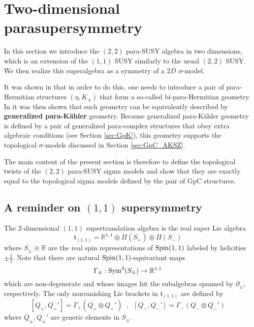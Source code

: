 \documentclass[letterpaper,12pt]{article}
\newcommand{\RR}{\mathbb{R}}
\theoremstyle{definition}
\theoremstyle{remark}
\theoremstyle{examples}
\begin{document}
\section{Two-dimensional parasupersymmetry}  \label{sec: parasusy}

In this section we introduce the $(2,2)$ para-SUSY algebra in two dimensions, which is an extension of the $(1,1)$ SUSY similarly to the usual $(2,2)$ SUSY. We then realize this superalgebra as a symmetry of a $2D$ $\sigma$-model.

It was shown in \cite{HullTwistedSUSY} that in order to do this, one needs to introduce a pair of para-Hermitian structures $(\eta,K_\pm)$ that form a so-called bi-para-Hermitian geometry. In \cite{Hu:2019zro} it was then shown that such geometry can be equivalently described by {\bf generalized para-K\"ahler} geometry. Because generalized para-K\"ahler geometry is defined by a pair of generalized para-complex structures that obey extra algebraic conditions (see Section \ref{sec:GpK}), this geometry supports the topological $\sigma$-models discussed in Section \ref{sec:GpC_AKSZ}.

The main content of the present section is therefore to define the topological twists of the $(2,2)$ para-SUSY sigma models and show that they are exactly equal to the topological sigma models defined by the pair of GpC structures.
%
%

\subsection{A reminder on $(1,1)$ supersymmetry}

The $2$-dimensional $(1,1)$ supertranslation algebra is the real super Lie algebra
\[
\mathfrak{t}_{(1,1)} = \RR^{1,1} \oplus \Pi (S_+) \oplus \Pi(S_-)
\]
where $S_\pm \cong \RR$ are the real spin representations of ${\rm Spin}(1,1)$ labeled by helicities $\pm \frac{1}{2}$. 
Note that there are natural ${\rm Spin}(1,1)$-equivariant maps
\[
\Gamma_{\pm} : {\rm Sym}^2(S_\pm) \to \RR^{1,1}
\]
which are non-degenerate and whose images hit the subalgebras spanned by $\partial_{\pm}$, respectively. 
The only nonvanishing Lie brackets in $\mathfrak{t}_{(1,1)}$ are defined by
\[
[Q_+, Q_+'] = \Gamma_+(Q_+ \otimes Q_+') \;\; , \;\; [Q_-, Q_-'] = \Gamma_-(Q_- \otimes Q_-')
\]  
where $Q_\pm, Q_\pm'$ are generic elements in $S_\pm$. 
\end{document}
